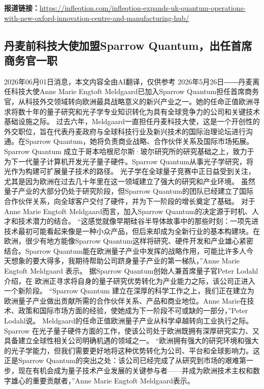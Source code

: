 \documentclass[12pt,a4paper]{ctexart}
\begin{document}
\noindent\textbf{报道链接：}\url{https://infleqtion.com/infleqtion-expands-uk-quantum-operations-with-new-oxford-innovation-centre-and-manufacturing-hub/}

\subsection{ 丹麦前科技大使加盟Sparrow Quantum，出任首席商务官一职 }

2026年06月01日消息，本文内容全由AI翻译，仅供参考
2026年5月26日――丹麦离任科技大使Anne Marie Engtoft Meldgaard已加入Sparrow Quantum担任首席商务官，从科技外交领域转向欧洲最具战略意义的新兴产业之一。她的任命正值欧洲寻求将数十年的量子研究和光子学专业知识转化为具有全球竞争力的公司和关键技术基础设施之际。
过去六年，Meldgaard一直担任丹麦科技大使，这是一个开创性的外交职位，旨在代表丹麦政府与全球科技行业及新兴技术的国际治理论坛进行沟通。在Sparrow Quantum，她将负责商业战略、合作伙伴关系及国际市场拓展。
Sparrow Quantum 成立于哥本哈根尼尔斯·玻尔研究所的研究基础之上，致力于为下一代量子计算机开发光子量子硬件。Sparrow Quantum从事光子学研究，将光作为构建可扩展量子技术的路径。
光子学在全球量子竞赛中正日益受到关注，尤其是因为欧洲在过去几十年里在这一领域建立了强大的研究和产业环境。
虽然量子产业的大部分仍处于研究阶段，但Sparrow Quantum的团队已经建立了国际合作伙伴关系，向全球客户交付了硬件，并为下一阶段的增长奠定了基础。
对于Anne Marie Engtoft Meldgaard而言，加入Sparrow Quantum的决定源于时机、人才和技术潜力的结合。
“这感觉就像早期硅谷半导体故事中的那些时刻：一项先进技术最初可能看起来像是一种小众产品，但后来却成为全新行业的基本构建块。在欧洲，很少有地方能像Sparrow Quantum这样将研究、硬件开发和产业雄心紧密结合。Sparrow Quantum能在欧洲量子产业中发挥的战略作用，可能比许多人今天想象的要大得多，我期待帮助公司跻身量子产业的第一梯队，”Anne Marie Engtoft Meldgaard 表示。
据Sparrow Quantum创始人兼首席量子官Peter Lodahl介绍，在 欧洲正寻求将自身的量子研究优势转化为产业能力之际，该公司正进入一个新阶段。
“Sparrow Quantum 建立在深厚的科学工作之上，我们正在建立为欧洲量子产业做出贡献所需的合作伙伴关系、产品和商业地位。Anne Marie在技术、政策和国际市场方面的经验，使她成为下一阶段不可或缺的一部分，”Peter Lodahl说。
Meldgaard的任命正值欧洲量子产业从科学卓越转向工业执行之际。Sparrow 在光子量子硬件方面的工作，使该公司处于欧洲既拥有深厚研究实力、又具备建立全球性相关公司明确机遇的领域之一。
“欧洲拥有强大的研究环境和强大的光子学能力，但我们需要更好地将这种优势转化为公司、平台和全球影响力。这正是Sparrow Quantum的突出之处：该公司已经完成了从研究到市场的艰难第一步，现在有机会成为量子技术产业发展的关键参与者——并成为欧洲技术主权和数字雄心的重要贡献者，”Anne Marie Engtoft Meldgaard表示。
\end{document}

